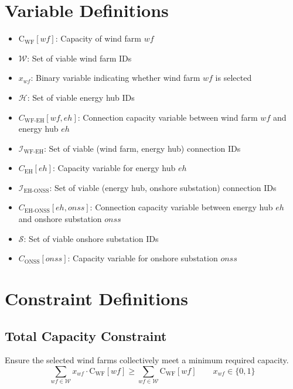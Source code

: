 \section*{Variable Definitions}

\begin{itemize}
    \item \( \text{C}_{\text{WF}}[wf] \): Capacity of wind farm \( wf \)
    \item \( \mathcal{W} \): Set of viable wind farm IDs
    \item \( x_{wf} \): Binary variable indicating whether wind farm \( wf \) is selected
    \item \( \mathcal{H} \): Set of viable energy hub IDs
    \item \( C_{\text{WF-EH}}[wf, eh] \): Connection capacity variable between wind farm \( wf \) and energy hub \( eh \)
    \item \( \mathcal{I}_{\text{WF-EH}} \): Set of viable (wind farm, energy hub) connection IDs
    \item \( C_{\text{EH}}[eh] \): Capacity variable for energy hub \( eh \)
    \item \( \mathcal{I}_{\text{EH-ONSS}} \): Set of viable (energy hub, onshore substation) connection IDs
    \item \( C_{\text{EH-ONSS}}[eh, onss] \): Connection capacity variable between energy hub \( eh \) and onshore substation \( onss \)
    \item \( \mathcal{S} \): Set of viable onshore substation IDs
    \item \( C_{\text{ONSS}}[onss] \): Capacity variable for onshore substation \( onss \)
\end{itemize}

\section*{Constraint Definitions}

\subsection*{Total Capacity Constraint}
Ensure the selected wind farms collectively meet a minimum required capacity.
\begin{equation}
    \sum_{wf \in \mathcal{W}} x_{wf} \cdot \text{C}_{\text{WF}}[wf] \geq \sum_{wf \in \mathcal{W}} \text{C}_{\text{WF}}[wf] \quad \quad x_{wf} \in \{0, 1\}
\end{equation}

